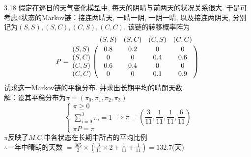 3.18 假定在逐日的天气变化模型中, 每天的阴晴与前两天的状况关系很大. 于是可考虑$4$状态的Markov链：接连两晴天, 一晴一阴, 一阴一晴, 以及接连两阴天, 分别记为$(S, S), (S, C), (C, S), (C, C)$. 该链的转移概率阵为
\[
P = 
\bordermatrix{
	~ & (S,S) & (S,C) & (C,S) & (C,C) \cr
	(S,S) & 0.8 & 0.2 & 0 & 0 \cr
	(S,C) & 0 & 0 & 0.4 & 0.6 \cr
	(C,S) & 0.6 & 0.4 & 0 & 0 \cr
	(C,C) & 0 & 0 & 0.1 & 0.9 \cr
}
\]
试求这一Markov链的平稳分布. 并求出长期平均的晴朗天数.\\
解：设其平稳分布为$\pi = (\pi_0, \pi_1, \pi_2, \pi_3)$\\
\[
\begin{cases}
\pi \geqslant 0\\
\sum\limits^3_{i=0} \pi_i = 1\\
\pi P = \pi
\end{cases}
\Rightarrow
\pi = (\frac{3}{11}, \frac{1}{11}, \frac{1}{11}, \frac{6}{11})
\]
$\pi$反映了$M.C.$中各状态在长期中所占的平均比例\\
$\therefore$一年中晴朗的天数 $ = \frac{365}{2} \times \left(\frac{3}{11} \times 2 + \frac{1}{11} + \frac{1}{11}\right) = 132.7$(天)


